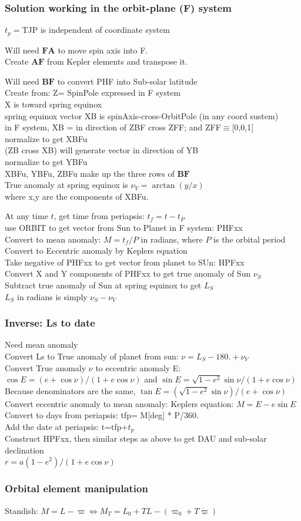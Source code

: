 \documentclass[draft]{article}
\newcommand{\qi}{\\ \hspace*{2.em}}      %
\newcommand{\qii}{\\ \hspace*{4.em}}     %
\newcommand{\qiii}{\\ \hspace*{6.em}}    %
\begin{document}
\subsubsection{Solution working in the orbit-plane (F) system}
 $t_p=$TJP is independent of coordinate system

Will need $\mathbf{FA}$ to move spin axis into F.
\qi Create $\mathbf{AF}$ from Kepler elements and transpose it.

Will need  $\mathbf{BF}$ to convert PHF into Sub-solar latitude
\qi Create from: Z= SpinPole expressed in F system
\qi  X is toward spring equinox
\qii spring equinox vector XB is spinAxis-cross-OrbitPole (in any coord sustem)
\qii in F system, XB = in direction of ZBF cross ZFF;  and  ZFF$\equiv$[0,0,1]
\qiii normalize to get XBFu
\qi (ZB cross XB) will generate vector in direction of YB
\qiii normalize to get YBFu
\qi XBFu, YBFu, ZBFu make up the three rows of  $\mathbf{BF}$ 
\qi True anomaly at spring equinox is $ \nu_V=\arctan(y/x)$ 
\qii  where x,y are the components of XBFu.

At any time $t$, get time from periapsis: $t_f=t-t_P$
\qi use ORBIT to get vector from Sun to Planet in F system: PHFxx
\qii Convert to mean anomaly: $M= t_f/P$ in radians, where $P$ is the orbital period
\qii Convert to Eccentric anomaly by Keplers equation
\qi Take negative of PHFxx to get vector from planet to SUn: HPFxx
\qi Convert X and Y components of PHFxx to get true anomaly of Sun $\nu_S$
\qi Subtract true anomaly of Sun at spring equinox to get $L_S$
\qii $L_S$ in radians is simply $\nu_S- \nu_V$

\subsubsection{ Inverse: Ls to date}
Need mean anomaly
\qi Convert Ls to True anomaly of planet from sun: $ \nu= L_S-180. + \nu_V  $
\qi Convert True anomaly $\nu$ to eccentric anomaly E:
\qii $\cos E =(e+ \cos \nu)/(1+ e\cos \nu) $ and $\sin E = \sqrt{1-e^2} \sin \nu /(1+ e\cos \nu)$
\qiii Because denominators are the same, $\tan E = (\sqrt{1-e^2} \sin \nu) /(e+ \cos \nu)$
\qi Convert eccentric anomaly to mean anomaly: Keplers equation: $M=E-e \sin E $
\qi Convert to days from periapsis: tfp= M[deg] * P/360.
\qi Add the date at periapsis: t=tfp$+t_p$
\qi Construct HPFxx, then similar steps as above to get DAU and sub-solar declination
\qiii $r=a(1-e^2)/(1+e \cos \nu)$


\subsubsection{Orbital element manipulation}
Standish: $M=L-\varpi  \Leftrightarrow M_T=L_0+T\dot{L}- \left( \varpi_0 +T\dot{\varpi} \right) $
\end{document}
